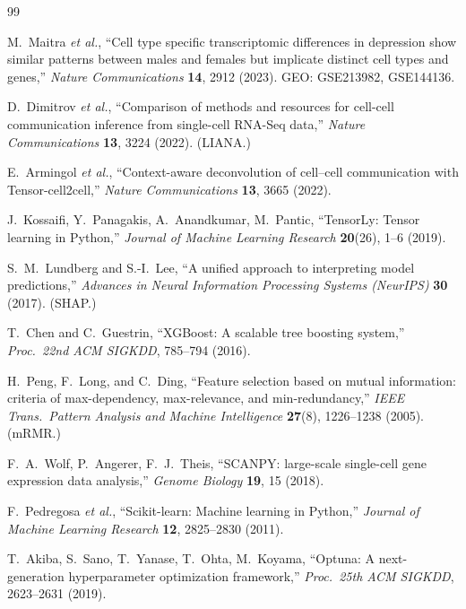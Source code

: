 \documentclass[11pt]{article}
\begin{document}
\begin{thebibliography}{99}

M.~Maitra \textit{et al.},
``Cell type specific transcriptomic differences in depression show similar
patterns between males and females but implicate distinct cell types and genes,''
\textit{Nature Communications} \textbf{14}, 2912 (2023).
GEO: GSE213982, GSE144136.

D.~Dimitrov \textit{et al.},
``Comparison of methods and resources for cell-cell communication inference from
single-cell RNA-Seq data,''
\textit{Nature Communications} \textbf{13}, 3224 (2022). (LIANA.)

E.~Armingol \textit{et al.},
``Context-aware deconvolution of cell--cell communication with
Tensor-cell2cell,''
\textit{Nature Communications} \textbf{13}, 3665 (2022).

J.~Kossaifi, Y.~Panagakis, A.~Anandkumar, M.~Pantic,
``TensorLy: Tensor learning in Python,''
\textit{Journal of Machine Learning Research} \textbf{20}(26), 1--6 (2019).

S.~M.~Lundberg and S.-I.~Lee,
``A unified approach to interpreting model predictions,''
\textit{Advances in Neural Information Processing Systems (NeurIPS)} \textbf{30}
(2017). (SHAP.)

T.~Chen and C.~Guestrin,
``XGBoost: A scalable tree boosting system,''
\textit{Proc.\ 22nd ACM SIGKDD}, 785--794 (2016).

H.~Peng, F.~Long, and C.~Ding,
``Feature selection based on mutual information: criteria of max-dependency,
max-relevance, and min-redundancy,''
\textit{IEEE Trans.\ Pattern Analysis and Machine Intelligence} \textbf{27}(8),
1226--1238 (2005). (mRMR.)

F.~A.~Wolf, P.~Angerer, F.~J.~Theis,
``SCANPY: large-scale single-cell gene expression data analysis,''
\textit{Genome Biology} \textbf{19}, 15 (2018).

F.~Pedregosa \textit{et al.},
``Scikit-learn: Machine learning in Python,''
\textit{Journal of Machine Learning Research} \textbf{12}, 2825--2830 (2011).

T.~Akiba, S.~Sano, T.~Yanase, T.~Ohta, M.~Koyama,
``Optuna: A next-generation hyperparameter optimization framework,''
\textit{Proc.\ 25th ACM SIGKDD}, 2623--2631 (2019).

\end{thebibliography}
\end{document}
